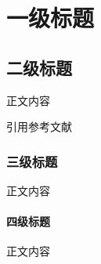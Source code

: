 \chapter{一级标题}

\section{二级标题}
正文内容

引用参考文献\cite{upper1974unsuccessful}

\subsection{三级标题}
正文内容

\subsubsection{四级标题}
正文内容

